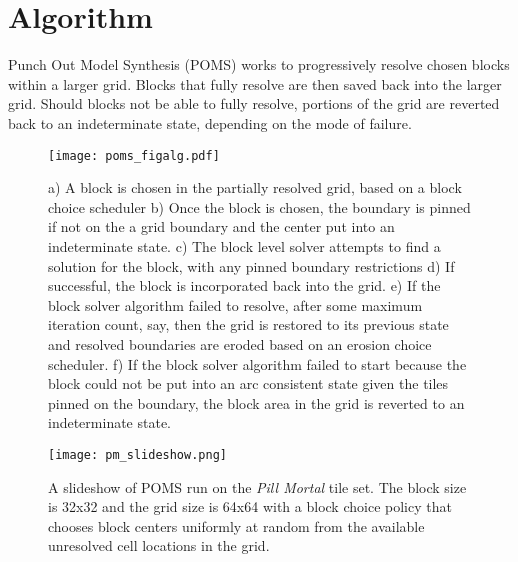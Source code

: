 \section{Algorithm}


Punch Out Model Synthesis (POMS) works to progressively resolve chosen
blocks within a larger grid.
Blocks that fully resolve are then saved back into the larger grid.
Should blocks not be able to fully resolve, portions of the grid
are reverted back to an indeterminate state, depending on the mode of failure.

%  

\begin{figure*}[ht]
  \centering
  \texttt{[image: poms\_figalg.pdf]}
  \caption{a) A block is chosen in the partially resolved grid, based on a block choice scheduler
  b) Once the block is chosen, the boundary is pinned if not on the a grid boundary and the center put
  into an indeterminate state. c) The block level solver attempts to find a solution for the block,
  with any pinned boundary restrictions d) If successful, the block is incorporated back into the grid.
  e) If the block solver algorithm failed to resolve, after some maximum iteration count, say, then
  the grid is restored to its previous state and resolved boundaries are eroded based on an erosion
  choice scheduler. f) If the block solver algorithm failed to start because the block could not be
  put into an arc consistent state given the tiles pinned on the boundary, the block area in the grid is reverted
  to an indeterminate state.}
  \label{fig:alg}
\end{figure*}


\begin{figure*}[ht]
  \centering
  \texttt{[image: pm\_slideshow.png]}
  \caption{A slideshow of POMS run on the \textit{Pill Mortal} tile set. The block size is 32x32 and the grid size is 64x64 with a block choice policy that chooses block centers uniformly at random from the available unresolved cell locations in the grid. }
  \label{fig:pmrun}
\end{figure*}

